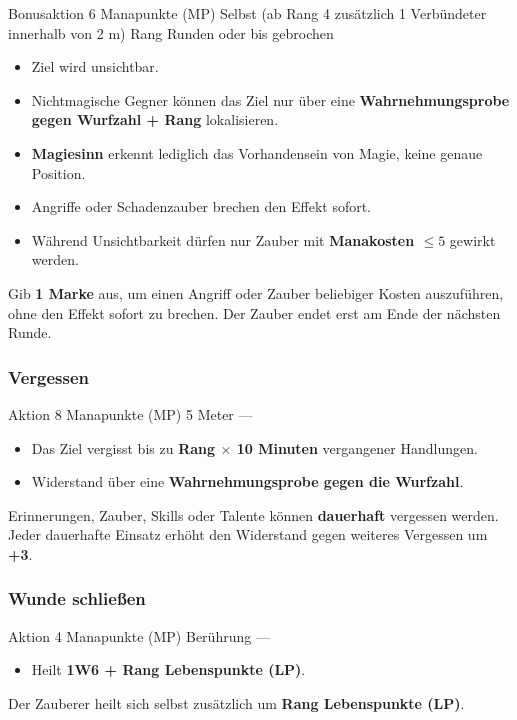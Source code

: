 \spellcard
{}
{Bonusaktion}
{6 Manapunkte (MP)}
{Selbst (ab Rang 4 zusätzlich 1 Verbündeter innerhalb von 2 m)}
{Rang Runden oder bis gebrochen}
{
	\begin{itemize}
		\item Ziel wird unsichtbar.
		\item Nichtmagische Gegner können das Ziel nur über eine
		\textbf{Wahrnehmungsprobe gegen Wurfzahl + Rang} lokalisieren.
		\item \textbf{Magiesinn} erkennt lediglich das Vorhandensein von Magie,
		keine genaue Position.
		\item Angriffe oder Schadenzauber brechen den Effekt sofort.
		\item Während Unsichtbarkeit dürfen nur Zauber mit
		\textbf{Manakosten $\le 5$} gewirkt werden.
	\end{itemize}
}
{
	Gib \textbf{1 Marke} aus, um einen Angriff oder Zauber beliebiger Kosten
	auszuführen, ohne den Effekt sofort zu brechen.
	Der Zauber endet erst am Ende der nächsten Runde.
}


\subsubsection*{Vergessen}

\spellcard
{}
{Aktion}
{8 Manapunkte (MP)}
{5 Meter}
{—}
{
	\begin{itemize}
		\item Das Ziel vergisst bis zu \textbf{Rang $\times$ 10 Minuten}
		vergangener Handlungen.
		\item Widerstand über eine \textbf{Wahrnehmungsprobe gegen die Wurfzahl}.
	\end{itemize}
}
{
	Erinnerungen, Zauber, Skills oder Talente können
	\textbf{dauerhaft} vergessen werden.
	Jeder dauerhafte Einsatz erhöht den Widerstand gegen weiteres Vergessen
	um \textbf{+3}.
}


\subsubsection*{Wunde schließen}

\spellcard
{}
{Aktion}
{4 Manapunkte (MP)}
{Berührung}
{—}
{
	\begin{itemize}
		\item Heilt \textbf{1W6 + Rang Lebenspunkte (LP)}.
	\end{itemize}
}
{
	Der Zauberer heilt sich selbst zusätzlich um
	\textbf{Rang Lebenspunkte (LP)}.
}


